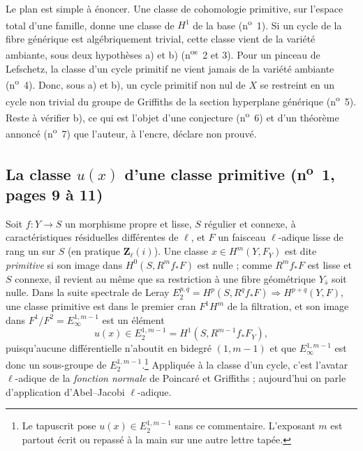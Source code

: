 \documentclass[11pt,a4paper]{article}
\begin{document}
Le plan est simple à énoncer. Une classe de cohomologie primitive, sur l'espace
total d'une famille, donne une classe de $H^1$ de la base (n\textsuperscript{o}~1).
Si un cycle de la fibre générique est algébriquement trivial, cette classe vient de
la variété ambiante, sous deux hypothèses a) et b) (n\textsuperscript{os}~2 et 3).
Pour un pinceau de Lefschetz, la classe d'un cycle primitif ne vient jamais de la
variété ambiante (n\textsuperscript{o}~4). Donc, sous a) et b), un cycle primitif
non nul de $X$ se restreint en un cycle non trivial du groupe de Griffiths de la
section hyperplane générique (n\textsuperscript{o}~5). Reste à vérifier b), ce qui
est l'objet d'une conjecture (n\textsuperscript{o}~6) et d'un théorème annoncé
(n\textsuperscript{o}~7) que l'auteur, à l'encre, déclare non prouvé.

\subsection*{La classe $u(x)$ d'une classe primitive (n\textsuperscript{o}~1, pages 9 à 11)}

Soit $f\colon Y \to S$ un morphisme propre et lisse, $S$ régulier et connexe, à
caractéristiques résiduelles différentes de $\ell$, et $F$ un faisceau
$\ell$-adique lisse de rang un sur $S$ (en pratique $\mathbf{Z}_\ell(i)$). Une
classe $x \in H^m(Y, F_Y)$ est dite \emph{primitive} si son image dans
$H^0(S, R^m f_* F)$ est nulle ; comme $R^m f_* F$ est lisse et $S$ connexe, il
revient au même que sa restriction à une fibre géométrique $Y_{\bar s}$ soit
nulle. Dans la suite spectrale de Leray
$E_2^{p,q} = H^p(S, R^q f_*F) \Rightarrow H^{p+q}(Y, F)$, une classe primitive est
dans le premier cran $F^1H^m$ de la filtration, et son image dans
$F^1/F^2 = E_\infty^{1,m-1}$ est un élément
\[ u(x) \in E_2^{1,m-1} = H^1(S, R^{m-1}f_*F_Y), \]
puisqu'aucune différentielle n'aboutit en bidegré $(1, m-1)$ et que
$E_\infty^{1,m-1}$ est donc un sous-groupe de $E_2^{1,m-1}$.\footnote{Le
tapuscrit pose $u(x) \in E_2^{1,m-1}$ sans ce commentaire. L'exposant $m$ est
partout écrit ou repassé à la main sur une autre lettre tapée.} Appliquée à la
classe d'un cycle, c'est l'avatar $\ell$-adique de la \emph{fonction normale}
de Poincaré et Griffiths ; aujourd'hui on parle d'application d'Abel--Jacobi
$\ell$-adique.
\end{document}
